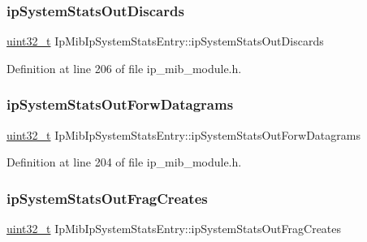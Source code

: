 \subsubsection{\texorpdfstring{ip\+System\+Stats\+Out\+Discards}{ipSystemStatsOutDiscards}}
{\footnotesize\ttfamily \hyperlink{stdint_8h_a435d1572bf3f880d55459d9805097f62}{uint32\+\_\+t} Ip\+Mib\+Ip\+System\+Stats\+Entry\+::ip\+System\+Stats\+Out\+Discards}



Definition at line 206 of file ip\+\_\+mib\+\_\+module.\+h.

\mbox{\label{structIpMibIpSystemStatsEntry_a7b19227919fc80e74a32c51abe78580d}} 
\subsubsection{\texorpdfstring{ip\+System\+Stats\+Out\+Forw\+Datagrams}{ipSystemStatsOutForwDatagrams}}
{\footnotesize\ttfamily \hyperlink{stdint_8h_a435d1572bf3f880d55459d9805097f62}{uint32\+\_\+t} Ip\+Mib\+Ip\+System\+Stats\+Entry\+::ip\+System\+Stats\+Out\+Forw\+Datagrams}



Definition at line 204 of file ip\+\_\+mib\+\_\+module.\+h.

\mbox{\label{structIpMibIpSystemStatsEntry_ae81f26cf10fd2f3e0b0f8358aad81c16}} 
\subsubsection{\texorpdfstring{ip\+System\+Stats\+Out\+Frag\+Creates}{ipSystemStatsOutFragCreates}}
{\footnotesize\ttfamily \hyperlink{stdint_8h_a435d1572bf3f880d55459d9805097f62}{uint32\+\_\+t} Ip\+Mib\+Ip\+System\+Stats\+Entry\+::ip\+System\+Stats\+Out\+Frag\+Creates}



